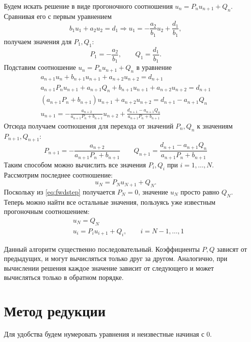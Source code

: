 \documentclass[12pt]{article}
\begin{document}
Будем искать решение в виде прогоночного соотношения $u_n = P_n u_{n+1} + Q_n$. 
Сравнивая его с первым уравнением 
\[
b_1 u_1 + a_2 u_2 = d_1 \Rightarrow u_1 = -\frac{a_2}{b_1} u_2 +
\frac{d_1}{b_1},
\]
получаем значения для $P_1, Q_1$:
\begin{equation}
P_1 = -\frac{a_2}{b_1}, \qquad Q_1 = \frac{d_1}{b_1}.
\label{eq:start}
\end{equation}
Подставим соотношение $u_n = P_n u_{n+1} + Q_n$ в уравнение
\begin{gather*}
a_{n+1} u_n + b_{n+1} u_{n+1} + a_{n+2} u_{n+2} = d_{n+1}\\
a_{n+1} P_n u_{n+1} + a_{n+1} Q_n + b_{n+1} u_{n+1} + a_{n+2} u_{n+2} = d_{n+1}\\
(a_{n+1} P_n + b_{n+1}) u_{n+1} + a_{n+2} u_{n+2} = d_{n+1} - a_{n+1} Q_n\\
u_{n+1} = -\frac{a_{n+2}}{a_{n+1} P_n + b_{n+1}} u_{n+2} + \frac{d_{n+1} -
a_{n+1} Q_n}{a_{n+1} P_n + b_{n+1}}
\end{gather*}
Отсюда получаем соотношения для перехода от значений $P_n, Q_n$ к значениям
$P_{n+1}, Q_{n+1}$:
\begin{equation}
P_{n+1} = -\frac{a_{n+2}}{a_{n+1} P_n + b_{n+1}} \qquad
Q_{n+1} = \frac{d_{n+1} - a_{n+1} Q_n}{a_{n+1} P_n + b_{n+1}}
\label{eq:fwdstep}
\end{equation}
Таким способом можно вычислить все значения $P_i, Q_i$ при $i = 1, \dots, N$.
Рассмотрим последнее соотношение:
\[
u_N = P_N u_{N+1} + Q_N.
\]
Поскольку из \eqref{eq:fwdstep} получается $P_N = 0$, значение $u_N$ просто равно $Q_N$.
Теперь можно найти все остальные значения, пользуясь уже известным прогоночным
соотношением:
\begin{align}
&u_N = Q_N\\
&u_i = P_i u_{i+1} + Q_i, \qquad i = N-1, \dots, 1
\end{align}

Данный алгоритм существенно последовательный. Коэффициенты $P, Q$ зависят от
предыдущих, и могут вычисляться только друг за другом. Аналогично, при
вычислении решения каждое значение зависит от следующего и может вычисляться
только в обратном порядке.

\section{Метод редукции}

Для удобства будем нумеровать уравнения и неизвестные начиная с 0.
\end{document}
